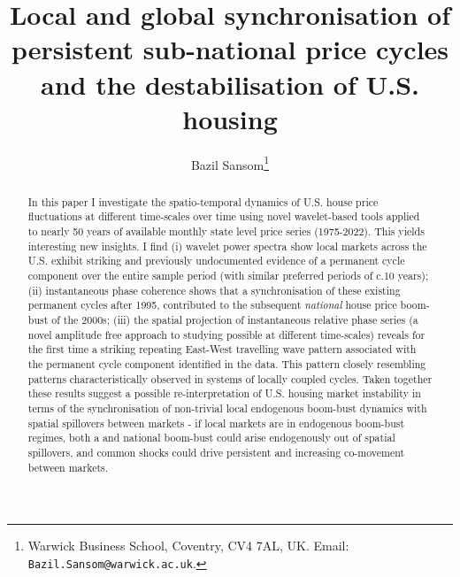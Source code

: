 \documentclass[11pt]{article}
\title{\Large\bfseries Local and global synchronisation of persistent sub-national price cycles and the destabilisation of U.S. housing}
\author{
  Bazil Sansom\thanks{Warwick Business School, Coventry, CV4 7AL, UK. Email: \texttt{Bazil.Sansom@warwick.ac.uk}.}
}
\date{} %
\begin{document}
\maketitle

\begin{abstract}
In this paper I investigate the spatio-temporal dynamics of U.S. house price fluctuations at different time-scales over time using novel wavelet-based tools applied to nearly 50 years of available monthly state level price series (1975-2022). This yields interesting new insights. I find (i) wavelet power spectra show local markets across the U.S. exhibit striking and previously undocumented evidence of a permanent cycle component over the entire sample period (with similar preferred periods of c.10 years); (ii) instantaneous phase coherence shows that a synchronisation of these existing permanent cycles after 1995, contributed to the subsequent \textit{national} house price boom-bust of the 2000s; (iii) the spatial projection of instantaneous relative phase series (a novel amplitude free approach to studying possible  at different time-scales) reveals for the first time a striking repeating East-West travelling wave pattern associated with the permanent cycle component identified in the data. This pattern closely resembling patterns characteristically observed in systems of locally coupled cycles. Taken together these results suggest a possible re-interpretation of U.S. housing market instability in terms of the synchronisation of non-trivial local endogenous boom-bust dynamics with spatial spillovers between markets - if local markets are in endogenous boom-bust regimes, both a  and national boom-bust could arise endogenously out of spatial spillovers, and common shocks could drive persistent and increasing co-movement between markets.

\end{abstract}
\end{document}
